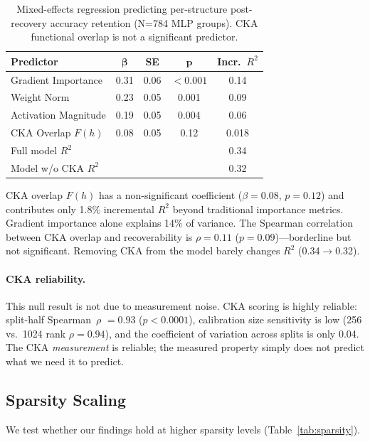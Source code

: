 \documentclass[11pt,a4paper]{article}
\newcommand{\spearman}{Spearman~$\rho$}
\begin{document}
\begin{table}[t]
\centering
\small
\begin{tabular}{lcccc}
\toprule
\textbf{Predictor} & $\boldsymbol{\beta}$ & \textbf{SE} & $\boldsymbol{p}$ & \textbf{Incr.\ $R^2$} \\
\midrule
Gradient Importance & 0.31 & 0.06 & ${<}0.001$ & 0.14 \\
Weight Norm & 0.23 & 0.05 & 0.001 & 0.09 \\
Activation Magnitude & 0.19 & 0.05 & 0.004 & 0.06 \\
CKA Overlap $F(h)$ & 0.08 & 0.05 & 0.12 & 0.018 \\
\midrule
Full model $R^2$ & & & & 0.34 \\
Model w/o CKA $R^2$ & & & & 0.32 \\
\bottomrule
\end{tabular}
\caption{Mixed-effects regression predicting per-structure post-recovery accuracy retention (N=784 MLP groups). CKA functional overlap is not a significant predictor.}
\label{tab:cka_regression}
\end{table}

CKA overlap $F(h)$ has a non-significant coefficient ($\beta{=}0.08$, $p{=}0.12$) and contributes only 1.8\% incremental $R^2$ beyond traditional importance metrics. Gradient importance alone explains 14\% of variance. The Spearman correlation between CKA overlap and recoverability is $\rho{=}0.11$ ($p{=}0.09$)---borderline but not significant. Removing CKA from the model barely changes $R^2$ (0.34$\to$0.32).

\paragraph{CKA reliability.}
This null result is not due to measurement noise. CKA scoring is highly reliable: split-half \spearman{} $= 0.93$ ($p{<}0.0001$), calibration size sensitivity is low (256 vs.\ 1024 rank $\rho{=}0.94$), and the coefficient of variation across splits is only 0.04. The CKA \emph{measurement} is reliable; the measured property simply does not predict what we need it to predict.


\subsection{Sparsity Scaling}
\label{sec:sparsity}

We test whether our findings hold at higher sparsity levels (Table~\ref{tab:sparsity}).
\end{document}
